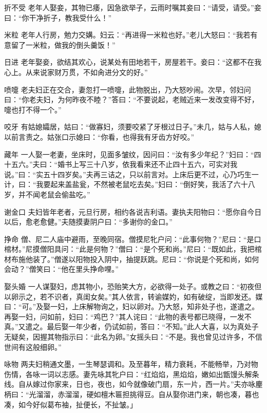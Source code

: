 \documentclass[12pt,UTF8]{ctexbook}
\begin{document}
折不受
老年人娶妾，其物已痿，因急欲举子，云雨时嘱其妾曰：“请受，请受。”妾曰：“你干净折子，教我受什么！”

米粒
老年人行房，勉力交媾。妇云：“再进得一米粒也好。”老儿大怒曰：“我若有意留了一米粒，做我的倒头羹饭！”

日进
老年娶妾，欲结其欢心，说某处有田地若干，房屋若干。妾曰：“这都不在我心上。从来说家财万贯，不如肏进分文的好。”

喷嚏
老夫妇正在交合，妻忽打一喷嚏，此物脱出，乃大怒吵闹。次早，邻妇问曰：“你老夫妇，为何昨夜不睦？”答曰：“不要说起，老贼近来一发改变得不好，嚏也打不得一个。”

咬牙
有姑媳孀居，姑曰：“做寡妇，须要咬紧了牙根过日子。”未几，姑与人私，媳以前言责之。姑张口示媳曰：“你看，也得我有牙齿方好咬。”

藏年
一人娶一老妻，坐床时，见面多皱纹，因问曰：“汝有多少年纪？”妇曰：“四十五六。”夫曰：“婚书上写三十八岁，依我看来还不止四十五六，可实对我说。”曰：“实五十四岁矣。”夫再三诘之，只以前言对。上床后更不过，心乃巧生一计，曰：“我要起来盖盐瓮，不然被老鼠吃去矣。”妇曰：“倒好笑，我活了六十八岁，并不闻老鼠会偷盐吃。”

谢金口
夫妇皆年老者，元旦行房，相约各说吉利语。妻执夫阳物曰：“愿你自今日以后，愈老愈健。”夫随摸妻阴户曰：“多谢你的金口。”

挣命
僧、尼二人庙中避雨，至晚同宿。僧摸尼牝户问：“此事何物？”尼曰：“是口棺材。”尼摸僧阳具问：“此是何物？”僧曰：“是个死和尚。”尼曰：“既如此，我把棺材布施他装了。”僧遂以阳物投入阴中，抽提跃跳。尼曰：“你说是个死和尚，如何会动？”僧笑曰：“他在里头挣命哩。”

娶头婚
一人谋娶妇，虑其物小，恐贻笑大方，必欲得一处子。或教之曰：“初夜但以卵示之，若不识者，真闺女矣。”其人依言，转谕媒妁，如有破绽，当即发还。媒曰：“可。”及娶一妇，上床解物询之，妇以卵对。乃大怒，知非处子也，遂遣之。再娶一妇，问如前，妇曰：“鸡巴？”其人诧曰：“此物的表号都已晓得，一发不真。”又遣之。最后娶一年少者，仍试如前，答曰：“不知。”此人大喜，以为真处子无疑矣，因握其物指示曰：“此名为卵。”女摇头曰：“不是。我也曾见过许多，不信世间有这般细卵。”

咏物
两夫妇稍通文墨，一生琴瑟调和。及至暮年，精力衰耗，不能畅举，乃对物伤情，各咏一词以志感。妻先咏其牝户曰：“红焰焰，黑焰焰，嫩如出甑馒头解条线。自从嫁过你家来，日也，夜也，如今就像破门扇，东一片，西一片。”夫亦咏麈柄曰：“光溜溜，赤溜溜，硬如檀木匾担挑得豆。自从娶你进门来，朝也凑，暮也凑，如今好似葛布袖，扯便长，不扯皱。」

\part{}
\end{document}
